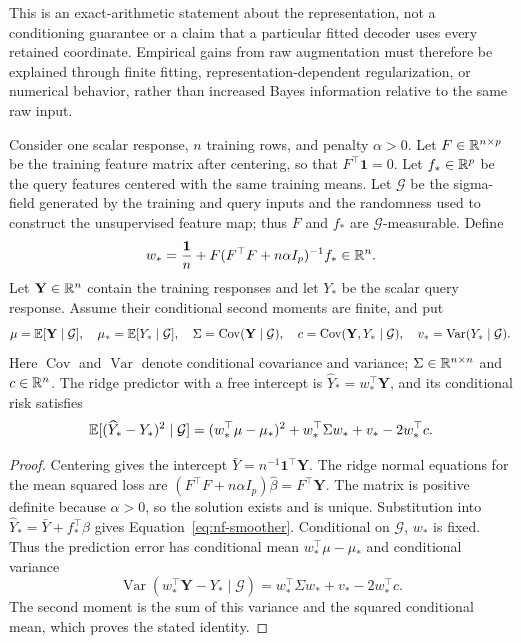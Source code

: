 This is an exact-arithmetic statement about the representation, not a
conditioning guarantee or a claim that a particular fitted decoder uses
every retained coordinate.  Empirical gains from raw augmentation must
therefore be explained through finite fitting, representation-dependent
regularization, or numerical behavior, rather than increased Bayes
information relative to the same raw input.

\begin{proposition}
\label{prop:nf-linear-risk}
Consider one scalar response, $n$ training rows, and penalty $\alpha>0$.
Let $F\in\mathbb{R}^{n\times p}$ be the training feature matrix after centering,
so that $F^\top\mathbf1=0$. Let $f_*\in\mathbb{R}^p$ be the query features
centered with the same training means. Let $\mathcal G$ be the
sigma-field generated by the training and query inputs and the
randomness used to construct the unsupervised feature map; thus $F$
and $f_*$ are $\mathcal G$-measurable. Define
\begin{equation}
 w_* = \frac{\mathbf1}{n}
       +F(F^\top F+n\alpha I_p)^{-1}f_*\in\mathbb{R}^n.
 \label{eq:nf-smoother}
\end{equation}
Let $\mathbf Y\in\mathbb{R}^n$ contain the training responses and let $Y_*$
be the scalar query response. Assume their conditional second moments
are finite, and put
\[
 \mu=\mathbb{E}[\mathbf Y\mid\mathcal G],\quad
 \mu_*=\mathbb{E}[Y_*\mid\mathcal G],\quad
 \Sigma=\operatorname{Cov}(\mathbf Y\mid\mathcal G),\quad
 c=\operatorname{Cov}(\mathbf Y,Y_*\mid\mathcal G),\quad
 v_*=\operatorname{Var}(Y_*\mid\mathcal G).
\]
Here $\operatorname{Cov}$ and $\operatorname{Var}$ denote conditional
covariance and variance; $\Sigma\in\mathbb{R}^{n\times n}$ and $c\in\mathbb{R}^n$.
The ridge predictor with a free intercept is $\widehat Y_*=w_*^\top\mathbf Y$,
and its conditional risk satisfies
\begin{equation}
 \mathbb{E}[(\widehat Y_*-Y_*)^2\mid\mathcal G]
   =(w_*^\top\mu-\mu_*)^2+w_*^\top\Sigma w_*+v_*-2w_*^\top c.
 \label{eq:nf-dependent-risk}
\end{equation}
\end{proposition}
\begin{proof}
Centering gives the intercept
$\bar Y=n^{-1}\mathbf1^\top\mathbf Y$. The ridge normal equations
for the mean squared loss are
$(F^\top F+n\alpha I_p)\widehat\beta=F^\top\mathbf Y$.
The matrix is positive definite because $\alpha>0$, so the solution
exists and is unique. Substitution into
$\widehat Y_*=\bar Y+f_*^\top\widehat\beta$ gives
Equation~\eqref{eq:nf-smoother}. Conditional on $\mathcal G$, $w_*$
is fixed. Thus the prediction error has conditional mean
$w_*^\top\mu-\mu_*$ and conditional variance
\[
 \operatorname{Var}(w_*^\top\mathbf Y-Y_*\mid\mathcal G)
 =w_*^\top\Sigma w_*+v_*-2w_*^\top c.
\]
The second moment is the sum of this variance and the squared
conditional mean, which proves the stated identity.
\end{proof}

